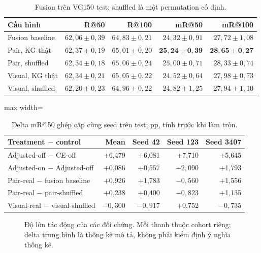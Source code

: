 \begin{table}[!t]\centering\small
\caption{Fusion trên VG150 test; shuffled là một permutation cố định.}\label{tab:fusion}
\begin{tabular}{@{}lrrrr@{}}\toprule
Cấu hình & R@50 & R@100 & mR@50 & mR@100\\\midrule
Fusion baseline & $62,06\pm0,39$ & $64,83\pm0,21$ & $24,32\pm0,91$ & $27,72\pm1,08$\\
Pair, KG thật & $62,37\pm0,19$ & $65,01\pm0,20$ & $\mathbf{25,24\pm0,39}$ & $\mathbf{28,65\pm0,27}$\\
Pair, shuffled & $62,34\pm0,18$ & $65,06\pm0,24$ & $25,00\pm0,71$ & $28,33\pm0,74$\\
Visual, KG thật & $62,34\pm0,21$ & $65,05\pm0,22$ & $24,52\pm0,64$ & $27,98\pm0,73$\\
Visual, shuffled & $62,20\pm0,23$ & $64,96\pm0,22$ & $24,82\pm1,25$ & $27,94\pm1,10$\\
\bottomrule\end{tabular}\end{table}

\begin{table}[!ht]\centering\small
\caption{Delta mR@50 ghép cặp cùng seed trên test; pp, tính trước khi làm tròn.}
\begin{adjustbox}{max width=\linewidth}\begin{tabular}{@{}lrrrr@{}}\toprule
Treatment $-$ control & Mean & Seed 42 & Seed 123 & Seed 3407\\\midrule
Adjusted-off $-$ CE-off & +6,479 & +6,081 & +7,710 & +5,645\\
Adjusted-on $-$ Adjusted-off & +0,086 & +0,557 & $-2,090$ & +1,793\\
Pair-real $-$ fusion baseline & +0,926 & +1,783 & $-0,560$ & +1,556\\
Pair-real $-$ pair-shuffled & +0,238 & +0,400 & $-0,823$ & +1,135\\
Visual-real $-$ visual-shuffled & $-0,300$ & $-0,917$ & +0,752 & $-0,735$\\
\bottomrule\end{tabular}\end{adjustbox}\end{table}

\begin{figure}[!ht]\centering
{}
\caption{Độ lớn tác động của các đối chứng. Mỗi thanh thuộc cohort riêng;
delta trung bình là thống kê mô tả, không phải kiểm định ý nghĩa thống kê.}
\end{figure}

